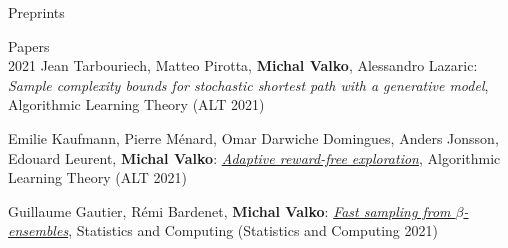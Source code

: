 \documentclass{resume}
\begin{document}
\begin{category}{Preprints}
\begin{category}{Papers\\2021}
\citembullet
Jean Tarbouriech, Matteo Pirotta, {\bf Michal Valko}, Alessandro Lazaric:
{\emph{Sample complexity bounds for stochastic shortest path with a generative model}},
Algorithmic Learning Theory
({\sf ALT 2021}) 


\citembullet
Emilie Kaufmann, Pierre M\' enard, Omar Darwiche Domingues, Anders Jonsson, Edouard Leurent, {\bf Michal Valko}:
\href{http://arxiv.org/abs/2006.06294}{\emph{Adaptive reward-free exploration}},
Algorithmic Learning Theory
({\sf ALT 2021}) 

\citembullet
Guillaume Gautier, R\' emi Bardenet, {\bf Michal Valko}:
\href{https://arxiv.org/pdf/2003.02344.pdf}
{\emph{Fast sampling from $\beta$-ensembles}},
Statistics and Computing
({\sf Statistics and Computing 2021}) 
\end{category}

\end{category}
\end{document}
